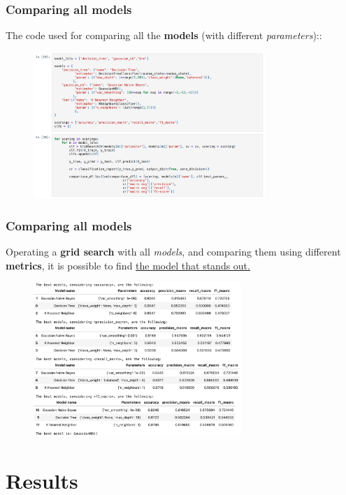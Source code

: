 \documentclass{beamer}
\begin{document}
\begin{frame}
\frametitle{Comparing all models}
The code used for comparing all the \textbf{models} (with different \textit{parameters})::
\begin{figure}
\centering
    \includegraphics[width=0.78\textwidth]{imgs/comparisons.png}
    \label{fig:comparisons}
\end{figure}
\end{frame}

\begin{frame}
\frametitle{Comparing all models}
Operating a \textbf{grid search} with all \textit{models}, and comparing them using different \textbf{metrics}, it is possible to find \underline{the model that stands out.}
\begin{figure}
\centering
    \includegraphics[width=0.7\textwidth]{imgs/testing.png}
    \label{fig:testing}
\end{figure}
\end{frame}


\section{Results}
\end{document}
